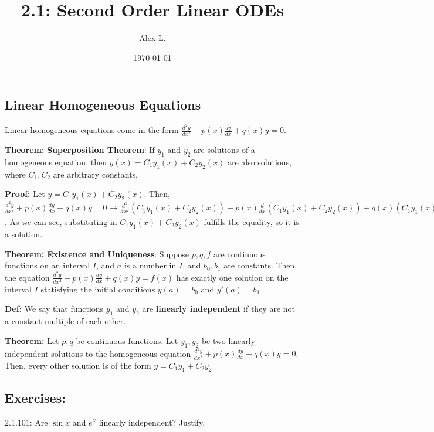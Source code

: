 \documentclass{article}
\title{2.1: Second Order Linear ODEs}
\author{Alex L.}
\date{\today}
\begin{document}
\maketitle
\subsection{Linear Homogeneous Equations}

Linear homogeneous equations come in the form $\frac{d^2y}{dx^2} + p(x)\frac{dy}{dx} + q(x)y = 0$. 

\textbf{Theorem:} \textbf{Superposition Theorem}: If $y_1$ and $y_2$ are solutions of a homogeneous equation, then $y(x) = C_1y_1(x) + C_2y_2(x)$ are also solutions, where $C_1, C_2$ are arbitrary constants. 

\textbf{Proof:} Let $y = C_1y_1(x) + C_2y_2(x)$. Then, $\frac{d^2y}{dx^2} + p(x) \frac{dy}{dx} + q(x)y = 0 \rightarrow \frac{d^2}{dx^2} (C_1y_1(x) + C_2y_2(x)) + p(x)\frac{d}{dx}(C_1y_1(x) + C_2y_2(x)) + q(x)(C_1y_1(x) + C_2y_2(x)) = \frac{d^2}{dx^2}C_1y_1 + \frac{d^2}{dx^2} C_2y_2 + \frac{d}{dx} C_1p(x)y_1 + \frac{d}{dx}C_2p(x)y_2 + C_1q(x)y_1 + C_2q(x)y_2 = C_1(\frac{d^2y}{dx^2}y_1 + p(x)y_1\frac{dy}{dx} + q(x)y_1) + C_1(\frac{d^2y}{dx^2}y_2 + p(x)y_2\frac{dy}{dx} + q(x)y_2) = 0$. As we can see, substituting in $C_1y_1(x) + C_2y_2(x)$ fulfills the equality, so it is a solution. 

\textbf{Theorem:} \textbf{Existence and Uniqueness}: Suppose $p,q,f$ are continuous functions on an interval $I$, and $a$ is a number in $I$, and $b_0,b_1$ are constants. Then, the equation $\frac{d^2y}{dx^2} + p(x)\frac{dy}{dx} + q(x)y = f(x)$ has exactly one solution on the interval $I$ statisfying the initial conditions $y(a) = b_0$ and $y'(a) = b_1$

\textbf{Def:} We say that functions $y_1$ and $y_2$ are \textbf{linearly independent} if they are not a constant multiple of each other. 

\textbf{Theorem:} Let $p,q$ be continuous functions. Let $y_1, y_2$ be two linearly independent solutions to the homogeneous equation $\frac{d^2y}{dx^2} + p(x)\frac{dy}{dx} + q(x)y = 0$. Then, every other solution is of the form $y = C_1y_1 + C_2y_2$


\subsection{Exercises:}

$2.1.101$: Are $\sin x$ and $e^x$ linearly independent? Justify.
\end{document}
